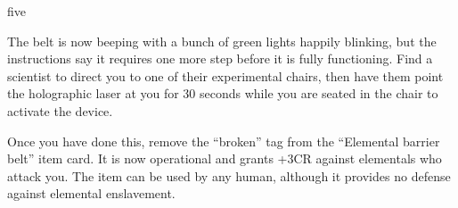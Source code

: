 \documentclass[notebook]{elementals}
\begin{document}
\begin{page}{five}

The belt is now beeping with a bunch of green lights happily blinking, but the instructions say it requires one more step before it is fully functioning. Find a scientist to direct you to one of their experimental chairs, then have them point the holographic laser at you for 30 seconds while you are seated in the chair to activate the device.

Once you have done this, remove the ``broken'' tag from the ``Elemental barrier belt'' item card. It is now operational and grants +3CR against elementals who attack you. The item can be used by any human, although it provides no defense against elemental enslavement.

\end{page}

\endnotebook
\end{document}
